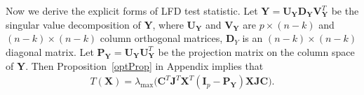 \documentclass[12pt]{article} %
\newcommand{\bX}{\mathbf{X}}
\newcommand{\bP}{\mathbf{P}}
\newcommand{\bY}{\mathbf{Y}}
\newcommand{\bJ}{\mathbf{J}}
\newcommand{\bC}{\mathbf{C}}
\newcommand{\bI}{\mathbf{I}}
\newcommand{\bU}{\mathbf{U}}
\newcommand{\bD}{\mathbf{D}}
\newcommand{\bV}{\mathbf{V}}
\theoremstyle{definition}
\begin{document}
Now we derive the explicit forms of LFD test statistic. 
Let $\bY=\bU_{\bY}\bD_{\bY}\bV_{\bY}^T$ be the singular value decomposition of $\bY$, where $\bU_{\bY}$ and $\bV_{\bY}$ are $p\times (n-k)$ and $(n-k)\times(n-k)$ column orthogonal matrices, $\bD_{Y}$ is an $(n-k)\times (n-k)$ diagonal matrix.
Let $\bP_{\bY}=\bU_{\bY}\bU_{\bY}^T$ be the projection matrix on the column space of $\bY$.
Then Proposition~\ref{optProp} in Appendix implies that
\begin{equation}\label{statisticForm1}
\begin{aligned}
    T(\bX)
    =\lambda_{\max}\big(\bC^T\bJ^T\bX^T (\bI_p-
    \bP_{\bY}
    )\bX\bJ\bC\big).
\end{aligned}
\end{equation}
\end{document}
